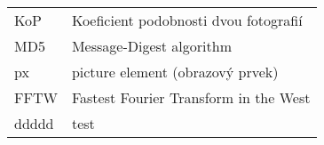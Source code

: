 
\seznamzkr

\begin{tabular}{ll}
  KoP	& Koeficient podobnosti dvou fotografií	\\
  MD5	& Message-Digest algorithm				\\
  px	& picture element (obrazový prvek)		\\
  FFTW	& Fastest Fourier Transform in the West \\
  ddddd	& test
\end{tabular}


